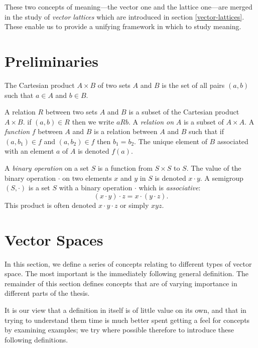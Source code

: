 \documentclass[12pt]{report}
\begin{document}
These two concepts of meaning---the vector one and the lattice one---are merged in the study of \emph{vector lattices} which are introduced in section \ref{vector-lattices}. These enable us to provide a unifying framework in which to study meaning.
 
 \section{Preliminaries}

\begin{defn}
The Cartesian product $A \times B$ of two sets $A$ and $B$ is the set of all pairs $(a,b)$ such that $a \in A$ and $b \in B$.
\end{defn}

\begin{defn}
A relation $R$ between two sets $A$ and $B$ is a subset of the Cartesian product $A \times B$. if $(a,b) \in R$ then we write $aRb$. A \emph{relation on} $A$ is a subset of $A \times A$. A \emph{function} $f$ between $A$ and $B$ is a relation between $A$ and $B$ such that if $(a,b_1) \in f$ and $(a,b_2) \in f$ then $b_1 = b_2$. The unique element of $B$ associated with an element $a$ of $A$ is denoted $f(a)$.
\end{defn}

\begin{defn}[Semigroup]
A \emph{binary operation} on a set $S$ is a function from $S\times S$ to $S$. The value of the binary operation $\cdot$ on two elements $x$ and $y$ in $S$ is denoted $x \cdot y$. A semigroup $(S,\cdot)$ is a set $S$ with a binary operation $\cdot$ which is \emph{associative}:
$$(x\cdot y)\cdot z = x \cdot (y \cdot z).$$
This product is often denoted $x\cdot y \cdot z$ or simply $xyz$.
\end{defn}
 
\section{Vector Spaces}
\label{vectors}

In this section, we define a series of concepts relating to different types of vector space. The most important is the immediately following general definition. The remainder of this section defines concepts that are of varying importance in different parts of the thesis.

It is our view that a definition in itself is of little value on its own, and that in trying to understand them time is much better spent getting a feel for concepts by examining examples; we try where possible therefore to introduce these following definitions.
\end{document}
